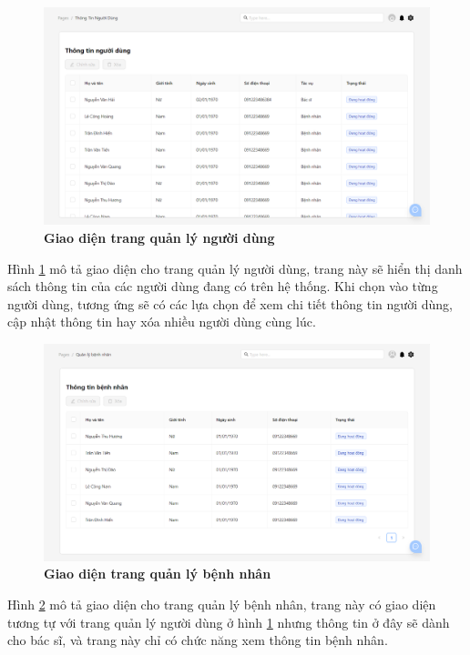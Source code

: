 \begin{figure}[H]
  \centering
  \includegraphics[scale=0.5]{Images/server/webUI/userTable.png}
  \caption[Giao diện trang quản lý người dùng]{\bfseries \fontsize{12pt}{0pt}\selectfont Giao diện trang quản lý người dùng}
  \label{userTable} %
\end{figure}

Hình \ref{userTable} mô tả giao diện cho trang quản lý người dùng, trang này sẽ hiển thị danh sách
thông tin của các người dùng đang có trên hệ thống. Khi chọn vào từng người dùng, tương ứng sẽ có các 
lựa chọn để xem chi tiết thông tin người dùng, cập nhật thông tin hay xóa nhiều người dùng cùng lúc.

\begin{figure}[H]
  \centering
  \includegraphics[scale=0.5]{Images/server/webUI/patientTable.png}
  \caption[Giao diện trang quản lý bệnh nhân]{\bfseries \fontsize{12pt}{0pt}\selectfont Giao diện trang quản lý bệnh nhân}
  \label{patientTable} %
\end{figure}

Hình \ref{patientTable} mô tả giao diện cho trang quản lý bệnh nhân, trang này có giao diện tương tự với trang 
quản lý người dùng ở hình \ref{userTable} nhưng thông tin ở đây sẽ dành cho bác sĩ, và trang này chỉ có chức năng xem thông tin bệnh nhân.

